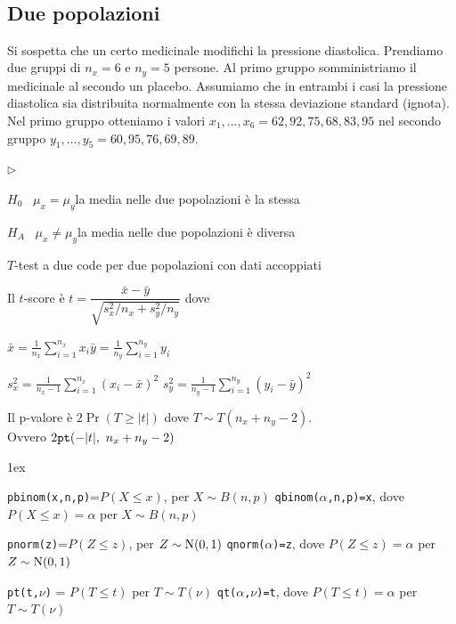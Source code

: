 \documentclass[11pt,openany]{book}
\newcommand{\mylabel}[1]{{\footnotesize\textsf{#1}}\hfill}
\renewenvironment{itemize}
  {\begin{list}{$\triangleright$}{%
   \setlength{\parskip}{0mm}
   \setlength{\topsep}{.2\baselineskip}
   \setlength{\rightmargin}{0mm}
   \setlength{\listparindent}{0mm}
   \setlength{\itemindent}{0mm}
   \setlength{\labelwidth}{3ex}
   \setlength{\itemsep}{.4\baselineskip}
   \setlength{\parsep}{0mm}
   \setlength{\partopsep}{0mm}
   \setlength{\labelsep}{1ex}
   \setlength{\leftmargin}{\labelwidth+\labelsep}
   \let\makelabel\mylabel}}{%
   \end{list}\vspace*{-1.3mm}}
\begin{document}


\clearpage\
\subsection{Due popolazioni}
Si sospetta che un certo medicinale modifichi la pressione diastolica.  Prendiamo due gruppi di $n_x=6$ e $n_y=5$ persone. Al primo gruppo somministriamo il medicinale al secondo un placebo. Assumiamo che in entrambi i casi la pressione diastolica sia distribuita normalmente con la stessa deviazione standard (ignota). Nel primo gruppo otteniamo i valori $x_1,\dots,x_6=62,92,75,68,83,95$ nel secondo gruppo $y_1,\dots,y_5=60,95,76,69,89$.

\begin{itemize}
\item[1.] $H_0$ \ $\mu_x = \mu_y$\hfill la media nelle due popolazioni è la stessa 

\item[2.] $H_A$ \ $\mu_x\neq\mu_y$\hfill la media nelle due popolazioni è diversa 


\item[3.] $T$-test a due code per due popolazioni con dati accoppiati

\item[3.] Il $t$-score è 
$t = \dfrac{\bar x - \bar y}{\sqrt{s^2_x/n_x+s^2_y/n_y}}$ dove 

$\displaystyle\bar x = \frac1{n_x}\sum^{n_x}_{i=1}x_i$\hfil$\displaystyle\bar y = \frac1{n_y}\sum^{n_y}_{i=1}y_i$


$\displaystyle s^2_x= \frac1{n_x-1}\sum^{n_x}_{i=1}(x_i-\bar x)^2$\hfil
$\displaystyle s^2_y= \frac1{n_y-1}\sum^{n_y}_{i=1}(y_i-\bar y)^2$




\item[4.] Il p-valore è $2\Pr(T\ge |t|)$ dove $T\sim T(n_x+n_y-2)$.\\ 
Ovvero $2 {\tt  pt}(-|t|,\  n_x+n_y-2)$
\end{itemize}


\vfill
\parskip1ex
{\hrulefill\scriptsize


{\tt pbinom(x,n,p)}=$P(X\le x)$, per $X\sim B(n,p)$
\hfill 
{\tt qbinom($\alpha$,n,p)=x},  dove $P(X\le x)=\alpha$ per $X\sim B(n,p)$

{\tt pnorm(z)}=$P(Z\le z)$, per $Z\sim {\rm N}(0,1)$
\hfill 
{\tt qnorm($\alpha$)=z},  dove $P(Z\le z)=\alpha$ per $Z\sim {\rm N}(0,1)$

{\tt pt(t,$\nu$)} = $P(T\le t)$ per $T\sim T(\nu)$
\hfill
{\tt qt($\alpha$,$\nu$)=t}, dove $P(T\le t)=\alpha$ per $T\sim T(\nu)$

}
\end{document}
